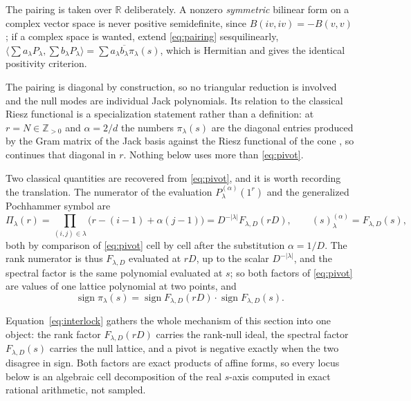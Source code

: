 \documentclass[11pt,letterpaper]{article}
\newcommand{\Zint}{\mathbb{Z}}
\newcommand{\Rr}{\mathbb{R}}
\begin{document}
The pairing is taken over $\Rr$ deliberately. A nonzero \emph{symmetric} bilinear
form on a complex vector space is never positive semidefinite, since
$B(iv,iv)=-B(v,v)$; if a complex space is wanted, extend \eqref{eq:pairing}
sesquilinearly, $\langle\sum a_\lambda P_\lambda,\sum b_\lambda P_\lambda\rangle
=\sum a_\lambda\overline{b_\lambda}\pi_\lambda(s)$, which is Hermitian and gives
the identical positivity criterion.

The pairing is diagonal by construction, so no triangular reduction is involved
and the null modes are individual Jack polynomials. Its relation to the classical
Riesz functional is a specialization statement rather than a definition: at
$r=N\in\Zint_{>0}$ and $\alpha=2/d$ the numbers $\pi_\lambda(s)$ are the diagonal
entries produced by the Gram matrix of the Jack basis against the Riesz
functional of the cone \cite{FK,DGR}, so  continues that diagonal
in $r$. Nothing below uses more than \eqref{eq:pivot}.

Two classical quantities are recovered from \eqref{eq:pivot}, and it is
worth recording the translation. The numerator of the evaluation
$P^{(\alpha)}_\lambda(1^r)$ and the generalized Pochhammer symbol are
\begin{equation}
  \Pi_\lambda(r)=\prod_{(i,j)\in\lambda}\bigl(r-(i-1)+\alpha(j-1)\bigr)
  =D^{-|\lambda|}F_{\lambda,D}(rD),
  \qquad
  (s)^{(\alpha)}_\lambda=F_{\lambda,D}(s),
  \label{eq:master-factors}
\end{equation}
both by comparison of \eqref{eq:pivot} cell by cell after the substitution
$\alpha=1/D$. The rank numerator is thus $F_{\lambda,D}$ evaluated at $rD$, up to
the scalar $D^{-|\lambda|}$, and the spectral factor is the same polynomial
evaluated at $s$; so both factors of \eqref{eq:pivot} are values of one lattice
polynomial at two points, and
\begin{equation}
  \operatorname{sign}\pi_\lambda(s)
  =\operatorname{sign}F_{\lambda,D}(rD)\cdot\operatorname{sign}F_{\lambda,D}(s).
  \label{eq:interlock}
\end{equation}

Equation~\eqref{eq:interlock} gathers the whole mechanism of this section into
one object: the rank factor $F_{\lambda,D}(rD)$ carries the rank-null ideal, the
spectral factor $F_{\lambda,D}(s)$ carries the null lattice, and a pivot is
negative exactly when the two disagree in sign. Both factors are exact products
of affine forms, so every locus below is an algebraic cell decomposition of the
real $s$-axis computed in exact rational arithmetic, not sampled.
\end{document}
